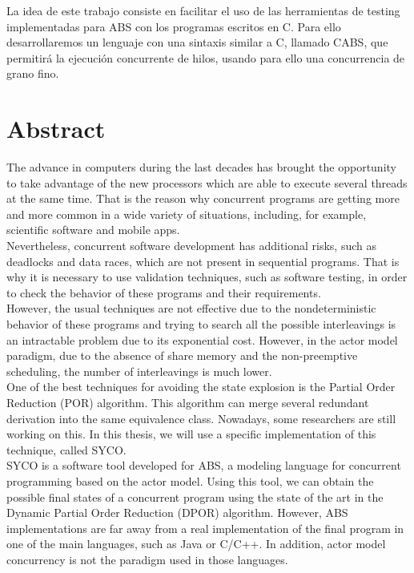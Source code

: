 La idea de este trabajo consiste en facilitar el uso de las herramientas de testing implementadas para ABS con los programas escritos en C. Para ello desarrollaremos un lenguaje con una sintaxis similar a C, llamado CABS, que permitirá la ejecución concurrente de hilos, usando para ello una concurrencia de grano fino.

\newpage
\thispagestyle{empty}

\chapter*{Abstract}
\thispagestyle{empty}
The advance in computers during the last decades has brought the opportunity to take advantage  of the new processors which are able to execute several threads at the same time. That is the reason why concurrent programs are getting more and more common in a wide variety of situations, including, for example, scientific software and mobile apps.\\

Nevertheless, concurrent software development has additional risks, such as deadlocks and data races, which are not present in sequential programs. That is why it is necessary to use validation techniques, such as software testing, in order to check the behavior of these programs and their requirements.\\

However, the usual techniques are not effective due to the nondeterministic behavior of these programs and trying to search all the possible interleavings is an intractable problem due to its exponential cost. However, in the actor model paradigm, due to the absence of share memory and the non-preemptive scheduling, the number of interleavings is much lower.\\

One of the best techniques for avoiding the state explosion is the Partial Order Reduction (POR) algorithm. This algorithm can merge several redundant derivation into the same equivalence class. Nowadays, some researchers are still working on this. In this thesis, we will use a specific implementation of this technique, called SYCO.\\

SYCO is a software tool developed for ABS, a modeling language for concurrent programming based on the actor model. Using this tool, we can obtain the possible final states of a concurrent program using the state of the art in the Dynamic Partial Order Reduction (DPOR) algorithm. However, ABS implementations are far away from a real implementation of the final program in one of the main languages, such as Java or C/C++. In addition, actor model concurrency is not the paradigm used in those languages.\\

